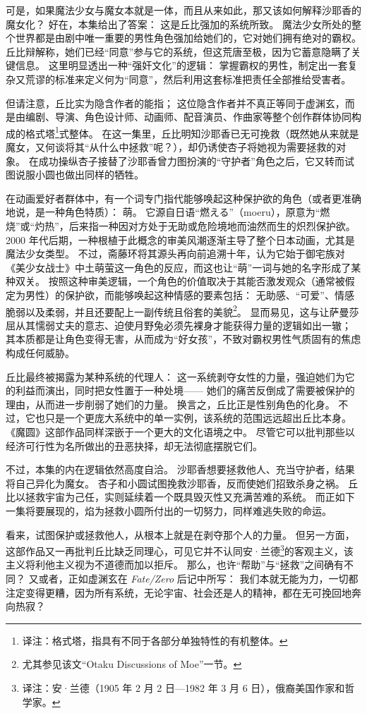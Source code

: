 可是，如果魔法少女与魔女本就是一体，而且从来如此，那又该如何解释沙耶香的魔女化？
好在，本集给出了答案：
这是丘比强加的系统所致。
魔法少女所处的整个世界都是由剧中唯一重要的男性角色强加给她们的，它对她们拥有绝对的霸权。
丘比辩解称，她们已经“同意”参与它的系统，但这荒唐至极，因为它蓄意隐瞒了关键信息。
这里明显透出一种“强奸文化”的逻辑：
掌握霸权的男性，制定出一套复杂又荒谬的标准来定义何为“同意”，然后利用这套标准把责任全部推给受害者。

但请注意，丘比实为隐含作者的能指；
这位隐含作者并不真正等同于虚渊玄，而是由编剧、导演、角色设计师、动画师、配音演员、作曲家等整个创作群体协同构成的格式塔\footnote{%
    译注：格式塔，指具有不同于各部分单独特性的有机整体。
}式整体。
在这一集里，丘比明知沙耶香已无可挽救（既然她从来就是魔女，又何谈将其“从什么中拯救”呢？），却仍诱使杏子将她视为需要拯救的对象。
在成功操纵杏子接替了沙耶香曾力图扮演的“守护者”角色之后，它又转而试图说服小圆也做出同样的牺牲。

在动画爱好者群体中，有一个词专门指代能够唤起这种保护欲的角色（或者更准确地说，是一种角色特质）：
萌。
它源自日语“燃える”（moeru），原意为“燃烧”或“灼热”，后来指一种因对方处于无助或危险境地而油然而生的炽烈保护欲。
2000 年代后期，一种根植于此概念的审美风潮逐渐主导了整个日本动画，尤其是魔法少女类型。
不过，斋藤环将其源头再向前追溯十年，认为它始于御宅族对《美少女战士》中土萌萤这一角色的反应，而这也让“萌”一词与她的名字形成了某种双关\cite{saito2011beautiful-fighting-girl}。
按照这种审美逻辑，一个角色的价值取决于其能否激发观众（通常被假定为男性）的保护欲，而能够唤起这种情感的要素包括：
无助感、“可爱”、情感脆弱以及柔弱，并且还要配上一副传统且俗套的美貌\footnote{%
    尤其参见该文“Otaku Discussions of Moe”一节。
}\cite{galbraith2009moe}。
显而易见，这与让萨曼莎屈从其懦弱丈夫的意志、迫使月野兔必须先裸身才能获得力量的逻辑如出一辙；
其本质都是让角色变得无害，从而成为“好女孩”，不致对霸权男性气质固有的焦虑构成任何威胁。

丘比最终被揭露为某种系统的代理人：
这一系统剥夺女性的力量，强迫她们为它的利益而演出，同时把女性置于一种处境——
她们的痛苦反倒成了需要被保护的理由，从而进一步削弱了她们的力量。
换言之，丘比正是性别角色的化身。
不过，它也只是一个更庞大系统中的单一实例，该系统的范围远远超出丘比本身。
《魔圆》这部作品同样深嵌于一个更大的文化语境之中。
尽管它可以批判那些以经济可行性为名所做出的丑恶抉择，却无法彻底摆脱它们。

不过，本集的内在逻辑依然高度自洽。
沙耶香想要拯救他人、充当守护者，结果将自己异化为魔女。
杏子和小圆试图挽救沙耶香，反而使她们招致杀身之祸。
丘比以拯救宇宙为己任，实则延续着一个既具毁灭性又充满苦难的系统。
而正如下一集将要展现的，焰为拯救小圆所付出的一切努力，同样难逃失败的命运。

看来，试图保护或拯救他人，从根本上就是在剥夺那个人的力量。
但另一方面，这部作品又一再批判丘比缺乏同理心，可见它并不认同安·兰德\footnote{%
    译注：安·兰德（1905 年 2 月 2 日—1982 年 3 月 6 日），俄裔美国作家和哲学家。
}的客观主义，该主义将利他主义视为不道德而加以拒斥\cite{badhwar-long-nodate-ayn-rand}。
那么，也许“帮助”与“拯救”之间确有不同？
又或者，正如虚渊玄在 \emph{Fate/Zero} 后记中所写：
我们本就无能为力，一切都注定变得更糟，因为所有系统，无论宇宙、社会还是人的精神，都在无可挽回地奔向热寂\cite{urobuchi2006fate-zero}？
